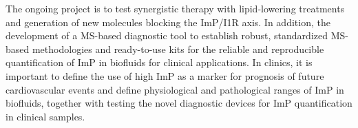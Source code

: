 The ongoing project is to test synergistic therapy with lipid-lowering treatments and generation of new molecules blocking the ImP/I1R axis. In addition, the development of a MS-based diagnostic tool to establish robust, standardized MS-based methodologies and ready-to-use kits for the reliable and reproducible quantification of ImP in biofluids for clinical applications. In clinics, it is important to define the use of high ImP as a marker for prognosis of future cardiovascular events and define physiological and pathological ranges of ImP in biofluids, together with testing the novel diagnostic devices for ImP quantification in clinical samples.


